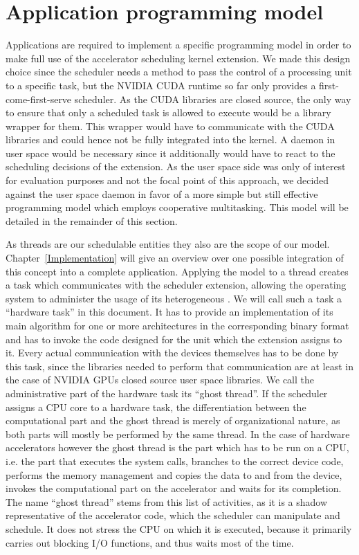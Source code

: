 \section{Application programming model}
\label{Concept}
\label{Concept:APM}

Applications are required to implement a specific programming model in order to make full use of the accelerator scheduling kernel extension. We made this design choice since the scheduler needs a method to pass the control of a processing unit to a specific task, but the NVIDIA CUDA runtime so far only provides a first-come-first-serve scheduler. As the CUDA libraries are closed source, the only way to ensure that only a scheduled task is allowed to execute would be a library wrapper for them. This wrapper would have to communicate with the CUDA libraries and could hence not be fully integrated into the kernel. A daemon in user space would be necessary since it additionally would have to react to the scheduling decisions of the extension. As the user space side was only of interest for evaluation purposes and not the focal point of this approach, we decided against the user space daemon in favor of a more simple but still effective programming model which employs cooperative multitasking. This model will be detailed in the remainder of this section.

As threads are our schedulable entities they also are the scope of our model. Chapter~\ref{Implementation} will give an overview over one possible integration of this concept into a complete application. Applying the model to a thread creates a task which communicates with the scheduler extension, allowing the operating system to administer the usage of its heterogeneous \cus{}. We will call such a task a ``hardware task'' in this document. It has to provide an implementation of its main algorithm for one or more architectures in the corresponding binary format and has to invoke the code designed for the unit which the extension assigns to it. Every actual communication with the devices themselves has to be done by this task, since the libraries needed to perform that communication are at least in the case of NVIDIA GPUs closed source user space libraries. We call the administrative part of the hardware task its ``ghost thread''. If the scheduler assigns a CPU core to a hardware task, the differentiation between the computational part and the ghost thread is merely of organizational nature, as both parts will mostly be performed by the same thread. In the case of hardware accelerators however the ghost thread is the part which has to be run on a CPU, i.e. the part that executes the system calls, branches to the correct device code, performs the memory management and copies the data to and from the device, invokes the computational part on the accelerator and waits for its completion. The name ``ghost thread'' stems from this list of activities, as it is a shadow representative of the accelerator code, which the scheduler can manipulate and schedule. It does not stress the CPU on which it is executed, because it primarily carries out blocking I/O functions, and thus waits most of the time.

